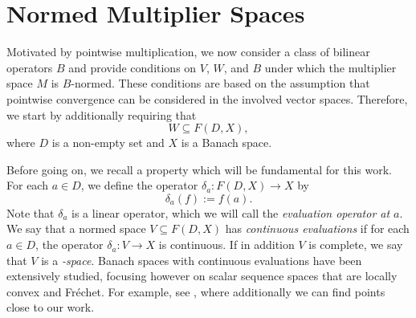 \documentclass[14pt, a4paper]{article}  %
\newcounter{property}
\providecommand{\pare}[1]{\left( #1\right) }
\newcommand{\tien}{\rightarrow}
\newcommand{\BK}{\text{BK}}
\begin{document}
   
   
    
   
    
   
   
   
   
    
   
   
 	 
	 
	
	
	


\section{Normed Multiplier Spaces}\label{pop2}

 

Motivated by pointwise multiplication, we now   consider a class of bilinear operators $B$ and provide conditions on $V$, $W$, and $B$ under which the multiplier space $M$ is $B$-normed. These conditions are based on the assumption that pointwise convergence can be considered in the involved vector spaces. Therefore, we start by additionally requiring    that
\begin{equation}  W\subseteq F\pare{D,X},
\end{equation} 
where  $D$ is a non-empty set and $X$  is a Banach space. 

  

		Before going on, we  recall a property  which will be fundamental for  this work.   For each $a\in D$, we define the operator $\delta_{a}:F\pare{D,X}\tien X$ by
	\begin{equation}
	\delta_{a}\pare{f}:=f\pare{a}.
	\end{equation}
	Note that $\delta_{a}$ is a linear operator, which we will call the \emph{evaluation operator at $a$}. We say that a normed space  $V\subseteq F\pare{D,X}$ has  \emph{continuous evaluations} if for each $a\in D$, the operator    $\delta_{a}:V\tien X$ is continuous. If in addition $V$ is complete, we say that $V$ is a \emph{\BK-space}. 	Banach spaces with continuous evaluations have been extensively studied, focusing however on scalar sequence spaces that are locally convex and Fréchet. For example, see \cite[Ch. 4]{Wil}, where additionally we can find  points close to our work.
		  
		  
 
\end{document}
